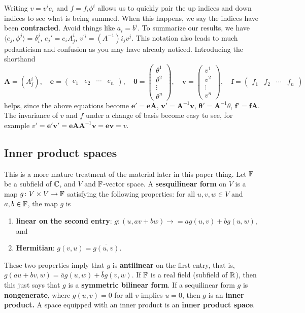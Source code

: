 Writing $v=v^i e_i $ and $f=f_i \phi^i $ allows us to quickly pair the up indices and down indices to see what is being summed. When this happens, we say the indices have been \textbf{contracted}. Avoid things like $a_i=b^i $. To summarize our results, we have $\langle e_j ,\phi^j  \rangle =\delta_i ^j $, $e_j '=e_i A^i _j $, $v^{'i}=(A^{-1})i_j v^j $. This notation also leads to much pedanticism and confusion as you may have already noticed. Introducing the shorthand \[
    \mathbf A=\left( A_j ^i  \right) ,\quad\mathbf e=
\begin{pmatrix}
    e_1&e_2&\cdots &e_n 
\end{pmatrix},\quad \mathbf {\theta} =
\begin{pmatrix}
    \theta^1\\ \theta^2\\ \vdots \\ \theta^n 
\end{pmatrix},\quad \mathbf v=
\begin{pmatrix}
    v^1\\v^2 \\ \vdots \\v^n 
\end{pmatrix},\quad \mathbf f=
\begin{pmatrix}
    f_1&f_2&\cdots &f_n 
\end{pmatrix}
\] helps, since the above equations become $\mathbf e'=\mathbf e\mathbf A$, $\mathbf v'=\mathbf A^{-1}\mathbf v$, $\mathbf \theta'=\mathbf A^{-1}\theta$, $\mathbf f'=\mathbf f\mathbf A$. The invariance of $v$ and $f$ under a change of basis become easy to see, for example $v'=\mathbf e'\mathbf v'=\mathbf e\mathbf A\mathbf A^{-1}\mathbf v=\mathbf e\mathbf v=v$.

\subsection{Inner product spaces}
This is a more mature treatment of the material later in this paper thing. Let $\mathbb{F}$ be a subfield of $\mathbb{C}$, and $V$ and $\mathbb{F}$-vector space. A \textbf{sesquilinear form} on $V$ is a map $g\colon V\times V \to \mathbb{F}$ satisfying the following properties: for all $u,v,w \in V$ and $a,b\in \mathbb{F}$, the map $g$ is 
\begin{enumerate}[label=(\roman*)]
\setlength\itemsep{-.2em} 
    \item \textbf{linear on the second entry}: $g\colon (u,av+bw) \to =ag(u,v)+bg(u,w)$, and 
    \item \textbf{Hermitian}: $g(v,u)=\overline{g(u,v)}$.
\end{enumerate}
These two properties imply that $g$ is \textbf{antilinear} on the first entry, that is, $g(au+bv,w)=\overline{a}g(u,w)+\overline{b}g(v,w)$. If $\mathbb{F}$ is a real field (subfield of $\mathbb{R}$), then this just says that $g$ is a \textbf{symmetric bilinear form}. If a sequilinear form $g$ is \textbf{nongenerate}, where $g(u,v)=0$ for all $v$ implies $u=0$, then $g$ is an \textbf{inner product.} A space equipped with an inner product is an \textbf{inner product space}.

